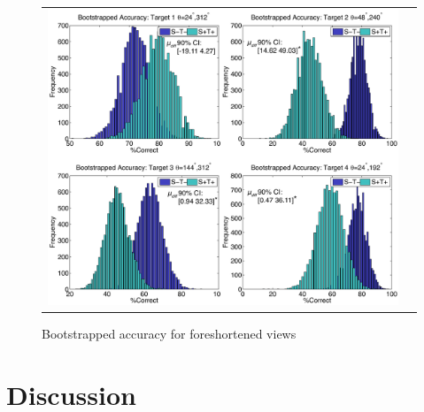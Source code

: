 \documentclass[dwyatte_dissertation.tex]{subfiles}
\begin{document}
\begin{figure}[h!]
\begin{center}
\begin{tabular}{ll}
\includegraphics[width=160mm]{figs/chap_bpleast/results_bootstrap_montage.pdf}
\end{tabular}
\end{center}
\caption{Bootstrapped accuracy for foreshortened views}{}
\label{fig:bpleast_behave_bootstrap}
\end{figure}

\section{Discussion}



\end{document}
